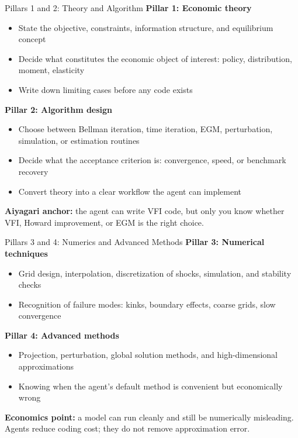 \documentclass[10pt,english,aspectratio=169]{beamer}
\begin{document}
\begin{frame}{Pillars 1 and 2: Theory and Algorithm}
\textbf{Pillar 1: Economic theory}
\begin{itemize}
    \item State the objective, constraints, information structure, and equilibrium concept
    \item Decide what constitutes the economic object of interest: policy, distribution, moment, elasticity
    \item Write down limiting cases before any code exists
\end{itemize}

\vspace{0.2cm}

\textbf{Pillar 2: Algorithm design}
\begin{itemize}
    \item Choose between Bellman iteration, time iteration, EGM, perturbation, simulation, or estimation routines
    \item Decide what the acceptance criterion is: convergence, speed, or benchmark recovery
    \item Convert theory into a clear workflow the agent can implement
\end{itemize}

\vspace{0.25cm}

\textbf{Aiyagari anchor:} the agent can write VFI code, but only you know whether VFI, Howard improvement, or EGM is the right choice.
\end{frame}

\begin{frame}{Pillars 3 and 4: Numerics and Advanced Methods}
\textbf{Pillar 3: Numerical techniques}
\begin{itemize}
    \item Grid design, interpolation, discretization of shocks, simulation, and stability checks
    \item Recognition of failure modes: kinks, boundary effects, coarse grids, slow convergence
\end{itemize}

\vspace{0.2cm}

\textbf{Pillar 4: Advanced methods}
\begin{itemize}
    \item Projection, perturbation, global solution methods, and high-dimensional approximations
    \item Knowing when the agent's default method is convenient but economically wrong
\end{itemize}

\vspace{0.25cm}

\textbf{Economics point:} a model can run cleanly and still be numerically misleading. Agents reduce coding cost; they do not remove approximation error.
\end{frame}
\end{document}
